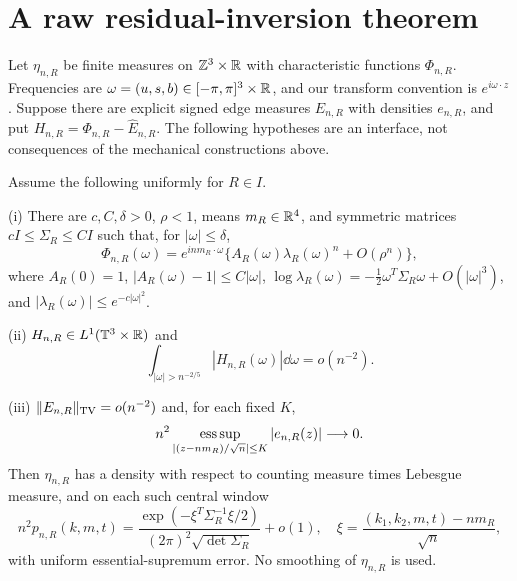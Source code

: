 \section{A raw residual-inversion theorem}
Let $\eta_{n,R}$ be finite measures on $\mathbb Z^3\times\mathbb R$ with characteristic functions $\Phi_{n,R}$. Frequencies are $\omega=(u,s,b)\in[-\pi,\pi]^3\times\mathbb R$, and our transform convention is $e^{i\omega\cdot z}$. Suppose there are explicit signed edge measures $E_{n,R}$ with densities $e_{n,R}$, and put $H_{n,R}=\Phi_{n,R}-\widehat E_{n,R}$. The following hypotheses are an interface, not consequences of the mechanical constructions above.

\begin{theorem}\label{thm:LLT}
Assume the following uniformly for $R\in I$.

\smallskip\noindent
(i) There are $c,C,\delta>0$, $\rho<1$, means $m_R\in\mathbb R^4$, and symmetric matrices $cI\le\Sigma_R\le CI$ such that, for $|\omega|\le\delta$,
\[
 \Phi_{n,R}(\omega)=e^{inm_R\cdot\omega}
 \{A_R(\omega)\lambda_R(\omega)^n+O(\rho^n)\},
\]
where $A_R(0)=1$, $|A_R(\omega)-1|\le C|\omega|$,
$\log\lambda_R(\omega)=-\tfrac12\omega^T\Sigma_R\omega+O(|\omega|^3)$, and $|\lambda_R(\omega)|\le e^{-c|\omega|^2}$.

\smallskip\noindent
(ii) $H_{n,R}\in L^1(\mathbb T^3\times\mathbb R)$ and
\begin{equation}\label{eq:tailcriterion}
 \int_{|\omega|>n^{-2/5}}|H_{n,R}(\omega)|\dd\omega=o(n^{-2}).
\end{equation}

\smallskip\noindent
(iii) $\|E_{n,R}\|_{\operatorname{TV}}=o(n^{-2})$ and, for each fixed $K$,
\[
 n^2\mathop{\rm ess\,sup}_{|(z-nm_R)/\sqrt n|\le K}|e_{n,R}(z)|\longrightarrow0.
\]
Then $\eta_{n,R}$ has a density with respect to counting measure times Lebesgue measure, and on each such central window
\begin{equation}\label{eq:LLT}
 n^2 p_{n,R}(k,m,t)=
 \frac{\exp(-\xi^T\Sigma_R^{-1}\xi/2)}{(2\pi)^2\sqrt{\det\Sigma_R}}+o(1),
 \quad \xi=\frac{(k_1,k_2,m,t)-nm_R}{\sqrt n},
\end{equation}
with uniform essential-supremum error. No smoothing of $\eta_{n,R}$ is used.
\end{theorem}
